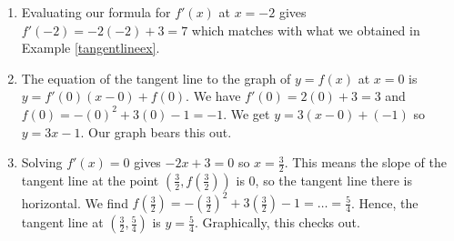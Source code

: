 \documentclass{ximera}
\begin{document}
\begin{example}
\begin{explanation}
\begin{enumerate}
\[\begin{array}{rclr}
 \frac{f(x+h)-f(x)}{h} & = &  \frac{( -x^2 - 2xh - h^2+3x+3h-1) -(-x^2+3x-1)}{h} & \\ 
 & = &  \frac{-x^2 - 2xh - h^2+3x+3h-1 + x^2-3x+1}{h} & \\ 
 & = &  \frac{-2xh-h^2+3h}{h} & \text{simplify}\\ 
 & = &   \frac{h(-2x - h + 3)}{h} & \text{factor} \\ 
 & = &   \frac{\cancel{h}(-2x-h+3)}{\cancel{h}} &  \text{cancel} \\ 
 & = & -2x-h+3\\ \end{array} \]

Our last step is to take the limit:   $f'(x) = \lim_{h \rightarrow 0}  \frac{f(x+h) - f(x)}{h} = \lim_{h \rightarrow 0} (-2x-h+3)$.  Notice here that we have two variables, $x$ and $h$, in the limit.  Of these two variables, we are taking the limit on the $h$:  $h \rightarrow 0$.  As far as $h$ is concerned, $x$ may as well be just another constant like the `$3$'.  Hence, $f'(x) = \lim_{h \rightarrow 0} (-2x-h+3)=  -2x - 0 + 3 = -2x+3$.

\item  Evaluating our formula for $f'(x)$ at $x = -2$ gives $f'(-2) = -2(-2) + 3 = 7$ which matches with what we obtained in Example \ref{tangentlineex}.

\item The equation of the tangent line to the graph of $y = f(x)$ at $x = 0$ is $y = f'(0) (x - 0) + f(0)$.  We have $f'(0)=2(0) + 3 = 3$ and $f(0) = -(0)^2+3(0)-1 = -1$.  We get $y = 3(x-0)+(-1)$ so $y = 3x-1$. Our graph bears this out.

\begin{center}
 \end{center}
 
 \item  Solving $f'(x) = 0$ gives $-2x+3 = 0$ so $x = \frac{3}{2}$.  This means the slope of the tangent line at the point $\left(\frac{3}{2}, f\left(\frac{3}{2}\right) \right)$ is $0$, so the tangent line there is horizontal.  We find 
 $f\left(\frac{3}{2}\right) = -\left( \frac{3}{2}\right)^2 + 3\left(\frac{3}{2}\right) - 1 = \ldots = \frac{5}{4}$.  Hence, the tangent line at  $\left(\frac{3}{2}, \frac{5}{4} \right)$ is $y = \frac{5}{4}$.  Graphically, this checks out.
 
 
\begin{center}
 \end{center}
 
\end{enumerate}
\end{explanation}
\end{example}
\end{document}
